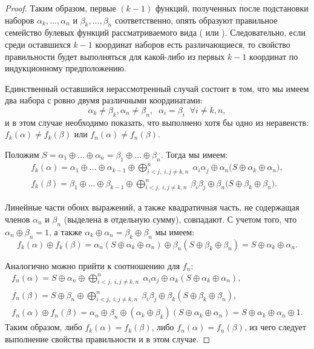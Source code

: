 \begin{proof}
        Таким образом, первые $(k-1)$ функций, полученных после подстановки наборов $\alpha_k, \ldots, \alpha_n$ и $\beta_k, \ldots, \beta_n$ соответственно, опять образуют правильное семейство булевых функций рассматриваемого вида ( или ).
        Следовательно, если среди оставшихся $k-1$ координат наборов есть различающиеся, то свойство правильности будет выполняться для какой-либо из первых $k-1$ координат по индукционному предположению.

        Единственный оставшийся нерассмотренный случай состоит в том, что мы имеем два набора с ровно двумя различными координатами:
        \[
            \alpha_k \ne \beta_k, \alpha_n \ne \beta_n, \; \; \alpha_i = \beta_i \; \; \forall i \ne k, n,
        \]
        и в этом случае необходимо показать, что выполнено хотя бы одно из неравенств: 
        $f_k(\alpha) \ne f_k(\beta)$ или $f_n(\alpha) \ne f_n(\beta)$. 


        Положим $S = \alpha_1 \oplus \ldots \oplus \alpha_{n} = \beta_1 \oplus \ldots \oplus \beta_{n}$.
        Тогда мы имеем:
        \begin{gather*}
            f_k(\alpha) = \alpha_1 \oplus \ldots \oplus \alpha_{k-1}
            \oplus \bigoplus_{i < j, \; i, j \ne k, n}^n \; \alpha_i \alpha_j
            \oplus \alpha_n \Big(S \oplus \alpha_k \oplus \alpha_n \Big), \\
            f_k(\beta) = \beta_1 \oplus \ldots \oplus \beta_{k-1}
            \oplus \bigoplus_{i < j, \; i, j \ne k, n}^n \; \beta_i \beta_j
            \oplus \beta_n \Big(S \oplus \beta_k \oplus \beta_n \Big).
        \end{gather*}

        Линейные части обоих выражений, а также квадратичная часть, не содержащая членов $\alpha_n$ и $\beta_n$ (выделена в отдельную сумму), совпадают.
        С учетом того, что $\alpha_n \oplus \beta_n = 1$, а также $ \alpha_k \oplus \alpha_n = \beta_k \oplus \beta_n $ 
        мы имеем: 
        \[
            f_k(\alpha) \oplus f_k(\beta) = 
            \alpha_n (S \oplus \alpha_k \oplus \alpha_n) \oplus
            \beta_n(S \oplus \beta_k \oplus \beta_n)  = S \oplus \alpha_k \oplus \alpha_n.
        \]

        Аналогично можно прийти к соотношению для $f_n$:
        \begin{gather*}
            f_n(\alpha) = S \oplus \alpha_n \oplus \bigoplus_{i < j, \; i, j \ne k, n}^n \; \alpha_i \alpha_j \oplus \alpha_k (S \oplus \alpha_k \oplus \alpha_n), \\
            f_n(\beta) = S \oplus \beta_n \oplus \bigoplus_{i < j, \; i, j \ne k, n}^n \; \beta_i \beta_j \oplus \beta_k (S \oplus \beta_k \oplus \beta_n), \\
            f_n(\alpha) \oplus f_n(\beta) = \alpha_n \oplus \beta_n \oplus (\alpha_k \oplus \beta_k) (S \oplus \alpha_k \oplus \alpha_n) = S \oplus \alpha_k \oplus \alpha_n \oplus 1.
        \end{gather*}
        Таким образом, либо $f_k(\alpha) = f_k(\beta)$, либо $f_n(\alpha) = f_n(\beta)$, из чего следует выполнение свойства правильности и в этом случае.
    \end{proof}


